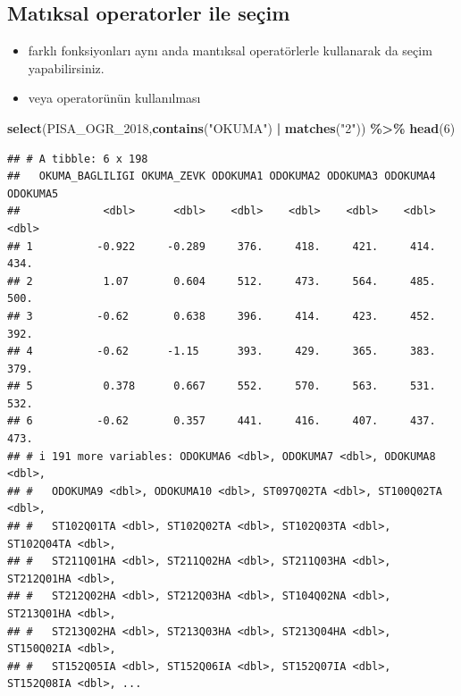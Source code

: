 \documentclass[
  oneside]{book}
\newenvironment{Shaded}{\begin{snugshade}}{\end{snugshade}}
\newcommand{\DecValTok}[1]{\textcolor[rgb]{0.00,0.00,0.81}{#1}}
\newcommand{\FunctionTok}[1]{\textcolor[rgb]{0.13,0.29,0.53}{\textbf{#1}}}
\newcommand{\NormalTok}[1]{#1}
\newcommand{\SpecialCharTok}[1]{\textcolor[rgb]{0.81,0.36,0.00}{\textbf{#1}}}
\newcommand{\StringTok}[1]{\textcolor[rgb]{0.31,0.60,0.02}{#1}}
\begin{document}
\hypertarget{matux131ksal-operatorler-ile-seuxe7im}{%
\subsection{Matıksal operatorler ile seçim}\label{matux131ksal-operatorler-ile-seuxe7im}}

\begin{itemize}
\item
  farklı fonksiyonları aynı anda mantıksal operatörlerle kullanarak da seçim yapabilirsiniz.
\item
  veya \textbf{\textbar{}} operatorünün kullanılması
\end{itemize}

\begin{Shaded}
\begin{Highlighting}[]
\FunctionTok{select}\NormalTok{(PISA\_OGR\_2018,}\FunctionTok{contains}\NormalTok{(}\StringTok{"OKUMA"}\NormalTok{) }\SpecialCharTok{|} \FunctionTok{matches}\NormalTok{(}\StringTok{"2"}\NormalTok{)) }\SpecialCharTok{\%\textgreater{}\%} \FunctionTok{head}\NormalTok{(}\DecValTok{6}\NormalTok{)}
\end{Highlighting}
\end{Shaded}

\begin{verbatim}
## # A tibble: 6 x 198
##   OKUMA_BAGLILIGI OKUMA_ZEVK ODOKUMA1 ODOKUMA2 ODOKUMA3 ODOKUMA4 ODOKUMA5
##             <dbl>      <dbl>    <dbl>    <dbl>    <dbl>    <dbl>    <dbl>
## 1          -0.922     -0.289     376.     418.     421.     414.     434.
## 2           1.07       0.604     512.     473.     564.     485.     500.
## 3          -0.62       0.638     396.     414.     423.     452.     392.
## 4          -0.62      -1.15      393.     429.     365.     383.     379.
## 5           0.378      0.667     552.     570.     563.     531.     532.
## 6          -0.62       0.357     441.     416.     407.     437.     473.
## # i 191 more variables: ODOKUMA6 <dbl>, ODOKUMA7 <dbl>, ODOKUMA8 <dbl>,
## #   ODOKUMA9 <dbl>, ODOKUMA10 <dbl>, ST097Q02TA <dbl>, ST100Q02TA <dbl>,
## #   ST102Q01TA <dbl>, ST102Q02TA <dbl>, ST102Q03TA <dbl>, ST102Q04TA <dbl>,
## #   ST211Q01HA <dbl>, ST211Q02HA <dbl>, ST211Q03HA <dbl>, ST212Q01HA <dbl>,
## #   ST212Q02HA <dbl>, ST212Q03HA <dbl>, ST104Q02NA <dbl>, ST213Q01HA <dbl>,
## #   ST213Q02HA <dbl>, ST213Q03HA <dbl>, ST213Q04HA <dbl>, ST150Q02IA <dbl>,
## #   ST152Q05IA <dbl>, ST152Q06IA <dbl>, ST152Q07IA <dbl>, ST152Q08IA <dbl>, ...
\end{verbatim}
\end{document}
